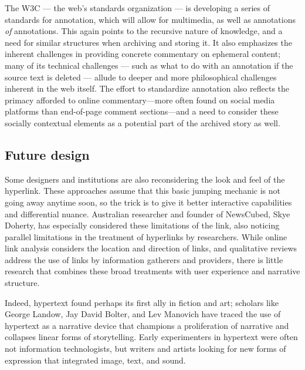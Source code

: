 The W3C --- the web's standards organization --- is developing a series of standards for annotation, which will allow for multimedia, as well as annotations \emph{of} annotations. This again points to the recursive nature of knowledge, and a need for similar structures when archiving and storing it. It also emphasizes the inherent challenges in providing concrete commentary on ephemeral content; many of its technical challenges --- such as what to do with an annotation if the source text is deleted --- allude to deeper and more philosophical challenges inherent in the web itself. The effort to standardize annotation also reflects the primacy afforded to online commentary---more often found on social media platforms than end-of-page comment sections---and a need to consider these socially contextual elements as a potential part of the archived story as well.

\subsection{Future design}

Some designers and institutions are also reconsidering the look and feel of the hyperlink. These approaches assume that this basic jumping mechanic is not going away anytime soon, so the trick is to give it better interactive capabilities and differential nuance. Australian researcher and founder of NewsCubed, Skye Doherty, has especially considered these limitations of the link, also noticing parallel limitations in the treatment of hyperlinks by researchers. While online link analysis considers the location and direction of links, and qualitative reviews address the use of links by information gatherers and providers, there is little research that combines these broad treatments with user experience and narrative structure.

Indeed, hypertext found perhaps its first ally in fiction and art; scholars like George Landow, Jay David Bolter, and Lev Manovich have traced the use of hypertext as a narrative device that champions a proliferation of narrative and collapses linear forms of storytelling. Early experimenters in hypertext were often not information technologists, but writers and artists looking for new forms of expression that integrated image, text, and sound.

